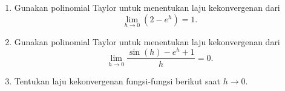 {\begin{enumerate}
\begin{enumerate}
\item ${\displaystyle \lim_{n\to\infty}\sin\frac{1}{n}=0}$
\item ${\displaystyle \lim_{n\to\infty}\sin\frac{1}{n^{2}}=0}$
\item ${\displaystyle \lim_{n\to\infty}\left(\sin\frac{1}{n}\right)^{2}=0}$
\item ${\displaystyle \lim_{n\to\infty}[\ln(n+1)-\ln(n)]=0}$
\end{enumerate}
Untuk soal \ref{exc:firstFunctionROC}-\ref{exc:lastFunctionROC},
gunakan definisi laju kekonvergenan fungsi berikut. Untuk fungsi $f(h)$,
kita mengatakan bahwa $\lim_{h\to a}f(h)=L$ memiliki laju kekonvergenan
$g(h)$ jika $|f(h)-L|\leq\lambda|g(h)|$ untuk suatu $\lambda>0$
dan semua $|h-a|$ yang cukup kecil.
\item \label{exc:firstFunctionROC} Gunakan polinomial Taylor untuk menentukan
laju kekonvergenan dari
\[
\lim_{h\to0}(2-e^{h})=1.
\]
\item Gunakan polinomial Taylor untuk menentukan laju kekonvergenan dari
\[
\lim_{h\to0}\frac{\sin(h)-e^{h}+1}{h}=0.
\]
\item Tentukan laju kekonvergenan fungsi-fungsi berikut saat $h\to0$.


\end{enumerate}}
